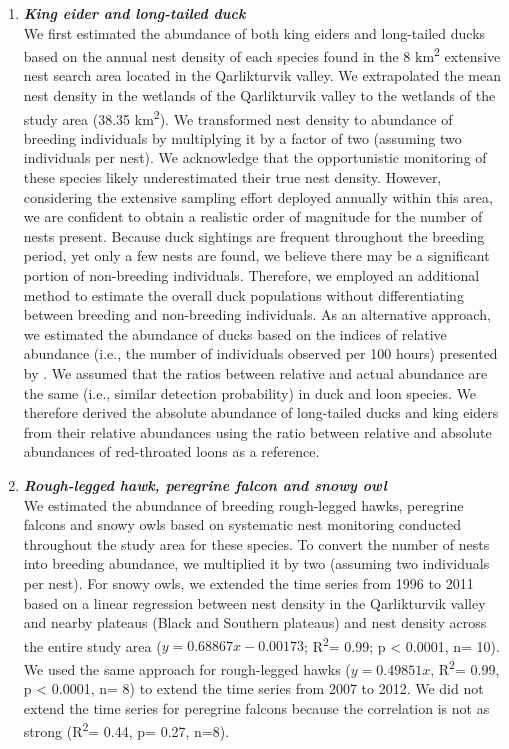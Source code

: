 \documentclass[a4paper,twoside,12pt]{article}
\begin{document}
\begin{enumerate}[label=\alph*.]
                \item[] \textit{\textbf{King eider and long-tailed duck}}\\
                We first estimated the abundance of both king eiders and long-tailed ducks based on the annual nest density of each species found in the 8 km\textsuperscript{2} extensive nest search area located in the Qarlikturvik valley. We extrapolated the mean nest density in the wetlands of the Qarlikturvik valley to the wetlands of the study area (38.35 km\textsuperscript{2}). We transformed nest density to abundance of breeding individuals by multiplying it by a factor of two (assuming two individuals per nest). We acknowledge that the opportunistic monitoring of these species likely underestimated their true nest density. However, considering the extensive sampling effort deployed annually within this area, we are confident to obtain a realistic order of magnitude for the number of nests present. Because duck sightings are frequent throughout the breeding period, yet only a few nests are found, we believe there may be a significant portion of non-breeding individuals. Therefore, we employed an additional method to estimate the overall duck populations without differentiating between breeding and non-breeding individuals. 
As an alternative approach, we estimated the abundance of ducks based on the indices of relative abundance (i.e., the number of individuals observed per 100 hours) presented by \citet{gauthier2024a}. We assumed that the ratios between relative and actual abundance are the same (i.e., similar detection probability) in duck and loon species. We therefore derived the absolute abundance of long-tailed ducks and king eiders from their relative abundances using the ratio between relative and absolute abundances of red-throated loons as a reference.
                                
                                
                \item[] \textit{\textbf{Rough-legged hawk, peregrine falcon and snowy owl}} \\
                We estimated the abundance of breeding rough-legged hawks, peregrine falcons and snowy owls based on systematic nest monitoring conducted throughout the study area for these species. To convert the number of nests into breeding abundance, we multiplied it by two (assuming two individuals per nest). For snowy owls, we extended the time series from 1996 to 2011 based on a linear regression between nest density in the Qarlikturvik valley and nearby plateaus (Black and Southern plateaus) and nest density across the entire study area ($y= 0.68867x -0.00173$; R\textsuperscript{2}= 0.99; p < 0.0001, n= 10). We used the same approach for rough-legged hawks ($y=0.49851x$, R\textsuperscript{2}= 0.99, p < 0.0001, n= 8) to extend the time series from 2007 to 2012. We did not extend the time series for peregrine falcons because the correlation is not as strong (R\textsuperscript{2}= 0.44, p= 0.27, n=8).
                

\end{enumerate}
\end{document}
